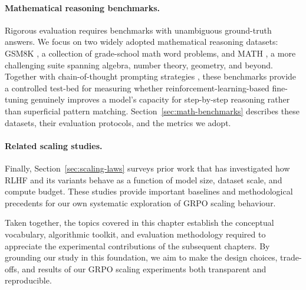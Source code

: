 \documentclass[12pt,a4paper]{report}
\begin{document}
\paragraph{Mathematical reasoning benchmarks.}
Rigorous evaluation requires benchmarks with unambiguous ground-truth
answers.  We focus on two widely adopted mathematical reasoning datasets:
GSM8K \citep{cobbe2021gsm8k}, a collection of grade-school math word
problems, and MATH \citep{hendrycks2021math}, a more challenging suite
spanning algebra, number theory, geometry, and beyond.  Together with
chain-of-thought prompting strategies \citep{wei2022chainofthought}, these
benchmarks provide a controlled test-bed for measuring whether
reinforcement-learning-based fine-tuning genuinely improves a model's
capacity for step-by-step reasoning rather than superficial pattern
matching.  Section~\ref{sec:math-benchmarks} describes these datasets, their
evaluation protocols, and the metrics we adopt.

\paragraph{Related scaling studies.}
Finally, Section~\ref{sec:scaling-laws} surveys prior work that has
investigated how RLHF and its variants behave as a function of model
size, dataset scale, and compute budget.  These studies provide important
baselines and methodological precedents for our own systematic exploration
of GRPO scaling behaviour.

\medskip
\noindent
Taken together, the topics covered in this chapter establish the conceptual
vocabulary, algorithmic toolkit, and evaluation methodology required to
appreciate the experimental contributions of the subsequent chapters.  By
grounding our study in this foundation, we aim to make the design choices,
trade-offs, and results of our GRPO scaling experiments both transparent
and reproducible.












\end{document}
